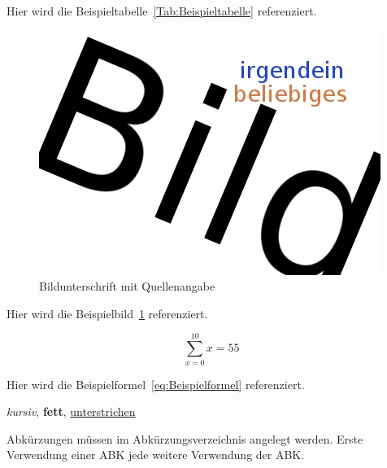 Hier wird die Beispieltabelle~\ref{Tab:Beispieltabelle} referenziert.

\begin{figure}[h] %
	\centering
	\includegraphics[scale=.25]{abbildungen/bild1}
	\caption[Bildunterschrift mit Quellenangabe]{Bildunterschrift mit Quellenangabe \cite{lcd}}
	\label{Fig:Bildbezeichnung}
\end{figure}

Hier wird die Beispielbild~\ref{Fig:Bildbezeichnung} referenziert.

\begin{equation} \label{eq:Beispielformel}
	\sum_{x=0}^{10}x=55
\end{equation}

Hier wird die Beispielformel~\ref{eq:Beispielformel} referenziert.

\textit{kursiv}, \textbf{fett}, \underline{unterstrichen}

Abkürzungen müssen im Abkürzungsverzeichnis angelegt werden.
Erste Verwendung einer \ac{ABK} jede weitere Verwendung der \ac{ABK}.

\nocite{*}

